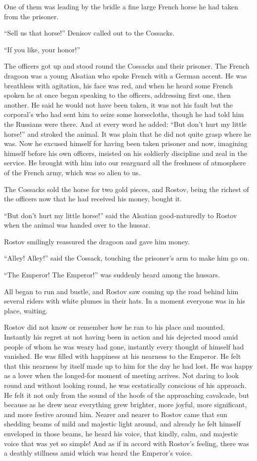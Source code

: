 One of them was leading by the bridle a fine large French horse
he had taken from the prisoner.

``Sell us that horse!'' Denisov called out to the Cossacks.

``If you like, your honor!''

The officers got up and stood round the Cossacks and their
prisoner. The French dragoon was a young Alsatian who spoke
French with a German accent. He was breathless with agitation,
his face was red, and when he heard some French spoken he at once
began speaking to the officers, addressing first one, then
another. He said he would not have been taken, it was not his
fault but the corporal's who had sent him to seize some
horsecloths, though he had told him the Russians were there. And
at every word he added: ``But don't hurt my little horse!'' and
stroked the animal. It was plain that he did not quite grasp
where he was. Now he excused himself for having been taken
prisoner and now, imagining himself before his own officers,
insisted on his soldierly discipline and zeal in the service. He
brought with him into our rearguard all the freshness of
atmosphere of the French army, which was so alien to us.

The Cossacks sold the horse for two gold pieces, and Rostov,
being the richest of the officers now that he had received his
money, bought it.

``But don't hurt my little horse!'' said the Alsatian
good-naturedly to Rostov when the animal was handed over to the
hussar.

Rostov smilingly reassured the dragoon and gave him money.

``Alley! Alley!'' said the Cossack, touching the prisoner's arm
to make him go on.

``The Emperor! The Emperor!'' was suddenly heard among the
hussars.

All began to run and bustle, and Rostov saw coming up the road
behind him several riders with white plumes in their hats. In a
moment everyone was in his place, waiting.

Rostov did not know or remember how he ran to his place and
mounted.  Instantly his regret at not having been in action and
his dejected mood amid people of whom he was weary had gone,
instantly every thought of himself had vanished. He was filled
with happiness at his nearness to the Emperor. He felt that this
nearness by itself made up to him for the day he had lost. He was
happy as a lover when the longed-for moment of meeting
arrives. Not daring to look round and without looking round, he
was ecstatically conscious of his approach. He felt it not only
from the sound of the hoofs of the approaching cavalcade, but
because as he drew near everything grew brighter, more joyful,
more significant, and more festive around him. Nearer and nearer
to Rostov came that sun shedding beams of mild and majestic light
around, and already he felt himself enveloped in those beams, he
heard his voice, that kindly, calm, and majestic voice that was
yet so simple! And as if in accord with Rostov's feeling, there
was a deathly stillness amid which was heard the Emperor's voice.

